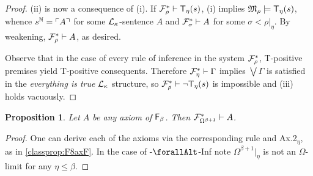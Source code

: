\documentclass[UKenglish,cleveref,DIV=12]{scrartcl}
\let\forall\forallAlt
\newtheorem{proposition}[lemma]{Proposition}
\newtheorem{corollary}[lemma]{Corollary}
\theoremstyle{definition}
\theoremstyle{definition}
\begin{document}
\begin{proof}
(ii) is now a consequence of (i). If $\mathcal{F}^*_\rho\vdash \mathsf{T}_\eta(s)$, (i) implies
$\mathfrak{M}_\rho\models \mathsf{T}_\eta(s)$, whence $s^\mathbb N=\ulcorner{A}\urcorner$ for some
$\mathcal{L}_\kappa$-sentence $A$ and $\mathcal{F}^*_\sigma\vdash A$ for some
$\sigma<\rho|_\eta$. By weakening, $\mathcal{F}^*_\rho\vdash A$, as desired.

Observe that in the case of every rule of inference in the system $\mathcal{F}^*_\rho$, T-positive
premises yield T-positive consequents. Therefore $\mathcal{F}^*_\eta\vdash\Gamma$ implies $\bigvee\Gamma$
is satisfied in the {\em everything is true} $\mathcal{L}_\kappa$ structure, so
$\mathcal{F}^*_\rho\vdash\lnot \mathsf{T}_\eta(s)$ is impossible and (iii) holds vacuously.
\end{proof}

\begin{proposition}\label{extprop:FFembed}
 Let $A$ be any axiom of $\mathsf{F}_\beta$. Then $\mathcal{F}^*_{\Omega^{\beta+1}}\vdash A$.
\end{proposition}
\begin{proof}
 One can derive each of the axioms via the corresponding rule and Ax.2$_\eta$, as in \cref{classprop:F8axF}. In the case of \textT\eta-$\forall$-Inf note $\Omega^{\beta+1}|_\eta$ is not an $\Omega$-limit for any $\eta\le\beta$.
\end{proof}
\end{document}
